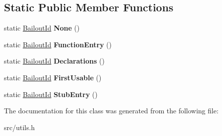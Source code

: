 \subsection*{Static Public Member Functions}
\begin{DoxyCompactItemize}
\item 
\hypertarget{classv8_1_1internal_1_1_bailout_id_ae28ec2edaa82bbe4857e4e56e709ab33}{}static \hyperlink{classv8_1_1internal_1_1_bailout_id}{Bailout\+Id} {\bfseries None} ()\label{classv8_1_1internal_1_1_bailout_id_ae28ec2edaa82bbe4857e4e56e709ab33}

\item 
\hypertarget{classv8_1_1internal_1_1_bailout_id_a92ecb683edac7021e0430f3800aab6e1}{}static \hyperlink{classv8_1_1internal_1_1_bailout_id}{Bailout\+Id} {\bfseries Function\+Entry} ()\label{classv8_1_1internal_1_1_bailout_id_a92ecb683edac7021e0430f3800aab6e1}

\item 
\hypertarget{classv8_1_1internal_1_1_bailout_id_a3cf70d09c511d9d723b08f7786b1c897}{}static \hyperlink{classv8_1_1internal_1_1_bailout_id}{Bailout\+Id} {\bfseries Declarations} ()\label{classv8_1_1internal_1_1_bailout_id_a3cf70d09c511d9d723b08f7786b1c897}

\item 
\hypertarget{classv8_1_1internal_1_1_bailout_id_a7fe9eca0a53d668361894dadd7a5f29b}{}static \hyperlink{classv8_1_1internal_1_1_bailout_id}{Bailout\+Id} {\bfseries First\+Usable} ()\label{classv8_1_1internal_1_1_bailout_id_a7fe9eca0a53d668361894dadd7a5f29b}

\item 
\hypertarget{classv8_1_1internal_1_1_bailout_id_a40e64c2d4e63153746fe3f1ae62ebc59}{}static \hyperlink{classv8_1_1internal_1_1_bailout_id}{Bailout\+Id} {\bfseries Stub\+Entry} ()\label{classv8_1_1internal_1_1_bailout_id_a40e64c2d4e63153746fe3f1ae62ebc59}

\end{DoxyCompactItemize}


The documentation for this class was generated from the following file\+:\begin{DoxyCompactItemize}
\item 
src/utils.\+h\end{DoxyCompactItemize}
